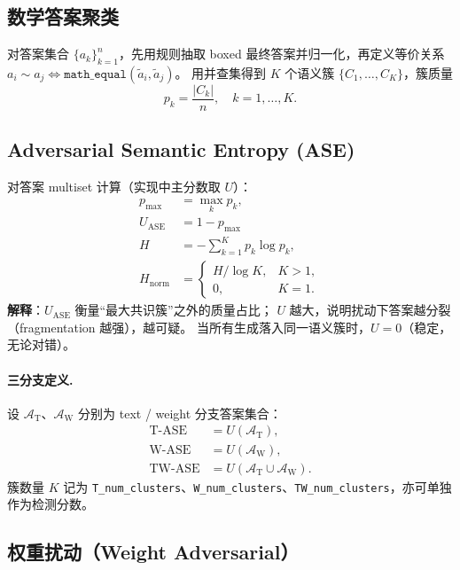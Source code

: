 \documentclass[11pt,a4paper]{article}
\begin{document}
\subsection{数学答案聚类}

对答案集合 $\{a_k\}_{k=1}^{n}$，先用规则抽取 boxed 最终答案并归一化，再定义等价关系
$a_i \sim a_j \Leftrightarrow \texttt{math\_equal}(\tilde a_i, \tilde a_j)$。
用并查集得到 $K$ 个语义簇 $\{C_1,\ldots,C_K\}$，簇质量
\begin{equation}
  p_k = \frac{|C_k|}{n}, \quad k=1,\ldots,K.
\end{equation}

\subsection{Adversarial Semantic Entropy (ASE)}

对答案 multiset 计算（实现中主分数取 $U$）：
\begin{align}
  p_{\max} &= \max_k p_k, \\
  U_{\mathrm{ASE}} &= 1 - p_{\max} \label{eq:U} \\
  H &= -\sum_{k=1}^{K} p_k \log p_k, \\
  H_{\mathrm{norm}} &= \begin{cases}
    H / \log K, & K > 1, \\
    0, & K = 1.
  \end{cases}
\end{align}
\textbf{解释}：$U_{\mathrm{ASE}}$ 衡量``最大共识簇''之外的质量占比；
$U$ 越大，说明扰动下答案越分裂（fragmentation 越强），越可疑。
当所有生成落入同一语义簇时，$U{=}0$（稳定，无论对错）。

\paragraph{三分支定义.}
设 $\mathcal{A}_{\mathrm{T}}$、$\mathcal{A}_{\mathrm{W}}$ 分别为 text / weight 分支答案集合：
\begin{align}
  \mathrm{T\text{-}ASE} &= U(\mathcal{A}_{\mathrm{T}}), \\
  \mathrm{W\text{-}ASE} &= U(\mathcal{A}_{\mathrm{W}}), \\
  \mathrm{TW\text{-}ASE} &= U(\mathcal{A}_{\mathrm{T}} \cup \mathcal{A}_{\mathrm{W}}).
\end{align}
簇数量 $K$ 记为 \texttt{T\_num\_clusters}、\texttt{W\_num\_clusters}、\texttt{TW\_num\_clusters}，亦可单独作为检测分数。

\subsection{权重扰动（Weight Adversarial）}
\end{document}
